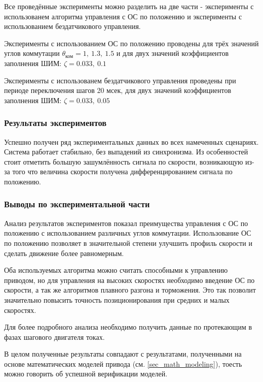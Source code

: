 Все проведённые эксперименты можно разделить на две части - эксперименты с
использованем алгоритма управления с ОС по положению и эксперименты
с использованием бездатчикового управления.

Эксперименты с использованием ОС по положению проводены для трёх значений
углов коммутации $\theta_\text{ком} = 1, ~1.3, ~1.5$ и для двух значений
коэффициентов заполнения ШИМ: $\zeta = 0.033, ~0.1$

Эксперименты с использованем бездатчикового управления проведены при периоде
переключения шагов 20 мсек, для двух значений коэффициентов заполнения ШИМ:
$\zeta = 0.033, ~0.05$

\subsubsection{Результаты экспериментов}

Успешно получен ряд экспериментальных данных во всех намеченных сценариях.
Система работает стабильно, без выпадений из синхронизма.
Из особенностей стоит отметить большую зашумлённость сигнала по скорости,
возникающую из-за того что величина скорости получена дифференцированием сигнала
по положению.

\subsubsection{Выводы по экспериментальной части}

Анализ результатов экспериментов показал преимущества управления с ОС
по положению с использованием различных углов коммутации. Использование ОС
по положению позволяет в значительной степени улучшить профиль скорости
и сделать движение более равномерным.

Оба используемых алгоритма можно считать способными к управлению приводом, но
для управления на высоких скоростях необходимо введение ОС по скорости, а так же
алгоритмов плавного разгона и торможения. Это так позволит значительно повысить
точность позиционирования при средних и малых скоростях.

Для более подробного анализа необходимо получить данные по протекающим в фазах
шагового двигателя токах.

В целом полученные результаты совпадают с результатами, полученными на основе
математических моделей привода (см. \ref{sec_math_modeling}), тоесть можно говорить
об успешной верификации моделей.
